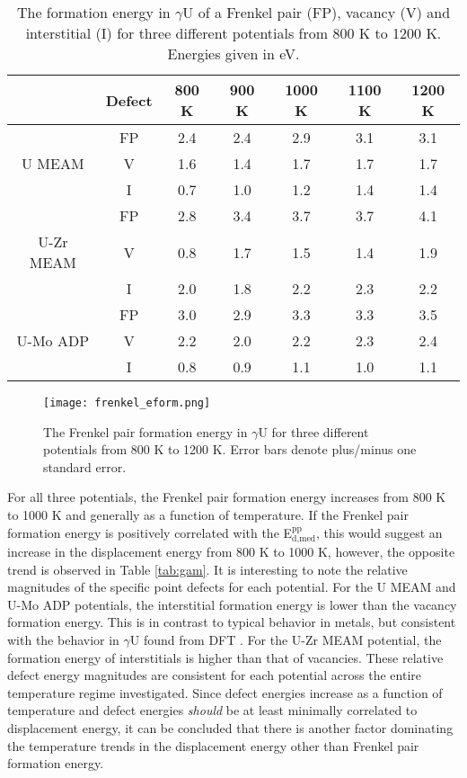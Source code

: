 \documentclass[review]{elsarticle}
\begin{document}
\begin{table}[h]
\caption{The formation energy in $\gamma$U of a Frenkel pair (FP), vacancy (V) and interstitial (I) for three different potentials from 800 K to 1200 K. Energies given in eV.} \label{tab:eform}
\begin{center}
\begin{tabular}{|c|c|c|c|c|c|c|}
	\hline
			& Defect	& 800 K & 900 K & 1000 K & 1100 K & 1200 K\\
	 \hline
			& FP	 & 2.4 & 2.4 & 2.9 & 3.1 & 3.1 \\
	 U MEAM 	& V	& 1.6 & 1.4 & 1.7 & 1.7 & 1.7 \\
	 		& I	& 0.7 & 1.0 & 1.2 & 1.4 & 1.4 \\
	\hline
	 		& FP	& 2.8 & 3.4 & 3.7 & 3.7 & 4.1 \\
	 U-Zr MEAM & V & 0.8 & 1.7 & 1.5 & 1.4 & 1.9 \\
			& I	& 2.0 & 1.8 & 2.2 & 2.3 & 2.2 \\
	 \hline
	 		& FP	& 3.0 & 2.9 & 3.3 & 3.3 & 3.5 \\
	 U-Mo ADP & V	& 2.2 & 2.0 & 2.2 & 2.3 & 2.4 \\
	 		& I	& 0.8 & 0.9 & 1.1 & 1.0 & 1.1 \\
	 \hline
\end{tabular}
\end{center}
\label{default}
\end{table}

\begin{figure}[h]
 \centering
 \texttt{[image: frenkel\_eform.png]} 
 \caption{The Frenkel pair formation energy in $\gamma$U for three different potentials from 800 K to 1200 K. Error bars denote plus/minus one standard error.}
 \label{fig:eform}
\end{figure}

\FloatBarrier

For all three potentials, the Frenkel pair formation energy increases from 800 K to 1000 K and generally as a function of temperature. If the Frenkel pair formation energy is positively correlated with the E$^{\textrm{pp}}_{\textrm{d,med}}$, this would suggest an increase in the displacement energy from 800 K to 1000 K, however, the opposite trend is observed in Table \ref{tab:gam}. It is interesting to note the relative magnitudes of the specific point defects for each potential. For the U MEAM and U-Mo ADP potentials, the interstitial formation energy is lower than the vacancy formation energy. This is in contrast to typical behavior in metals, but consistent with the behavior in $\gamma$U found from DFT \cite{beeler2010}. For the U-Zr MEAM potential, the formation energy of interstitials is higher than that of vacancies. These relative defect energy magnitudes are consistent for each potential across the entire temperature regime investigated. Since defect energies increase as a function of temperature and defect energies \textit{should} be at least minimally correlated to displacement energy, it can be concluded that there is another factor dominating the temperature trends in the displacement energy other than Frenkel pair formation energy.
\end{document}
